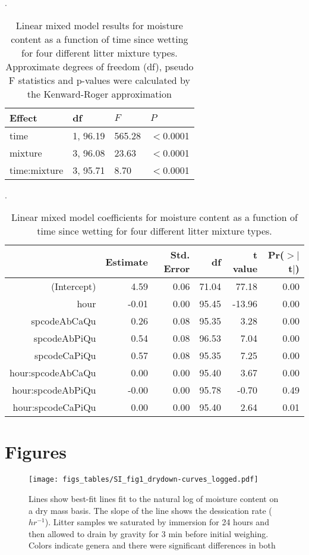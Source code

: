 \documentclass[letterpaper]{article}
\begin{document}
\begin{table}[H]
  \caption{Linear mixed model results for moisture content as a function of
    time since wetting for four different litter mixture types. Approximate
    degrees of freedom (df), pseudo F statistics and p-values were calculated
    by the Kenward-Roger approximation}.
  \label{tab:mixtures_drydown}
\centering

\begin{tabular}{llll}
  \toprule
Effect & df & $F$ & $P$ \\ 
  \midrule
time & 1, 96.19 & 565.28 & $<$0.0001 \\ 
  mixture & 3, 96.08 & 23.63 & $<$0.0001 \\ 
  time:mixture & 3, 95.71 & 8.70 & $<$0.0001 \\ 
   \bottomrule
\end{tabular}
\end{table}

\begin{table}[H]
  \caption{Linear mixed model coefficients for moisture content as a function of
    time since wetting for four different litter mixture types.}.
  \label{tab:mixtures_drydown}
\centering
\begin{tabular}{rrrrrr}
  \toprule
 & Estimate & Std. Error & df & t value & Pr($>$$|$t$|$) \\ 
  \midrule
(Intercept) & 4.59 & 0.06 & 71.04 & 77.18 & 0.00 \\ 
  hour & -0.01 & 0.00 & 95.45 & -13.96 & 0.00 \\ 
  spcodeAbCaQu & 0.26 & 0.08 & 95.35 & 3.28 & 0.00 \\ 
  spcodeAbPiQu & 0.54 & 0.08 & 96.53 & 7.04 & 0.00 \\ 
  spcodeCaPiQu & 0.57 & 0.08 & 95.35 & 7.25 & 0.00 \\ 
  hour:spcodeAbCaQu & 0.00 & 0.00 & 95.40 & 3.67 & 0.00 \\ 
  hour:spcodeAbPiQu & -0.00 & 0.00 & 95.78 & -0.70 & 0.49 \\ 
  hour:spcodeCaPiQu & 0.00 & 0.00 & 95.40 & 2.64 & 0.01 \\ 
   \bottomrule
\end{tabular}
\end{table}

\section{Figures}

\begin{figure}[H]
  \centering
  \texttt{[image: figs\_tables/SI\_fig1\_drydown-curves\_logged.pdf]}
   \label{SI_fig1}
\caption[Semi-log scale dry down curves for eight litter types.]{Lines show best-fit lines fit to the natural log of moisture content on a dry mass basis.  The slope of the line shows the dessication rate ($hr^{-1}$). Litter samples we saturated by immersion for 24 hours and then allowed to drain by gravity for 3 min before initial weighing. Colors indicate genera and there were significant differences in both }

\end{figure}
\end{document}
